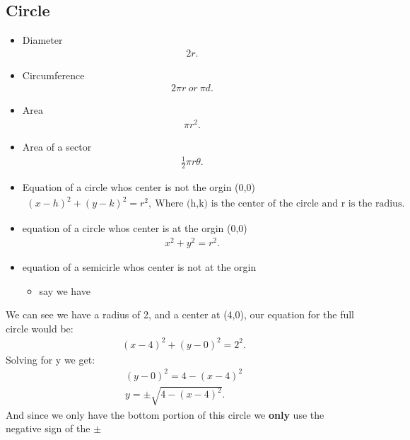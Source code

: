 \documentclass{report}
\begin{document}
    \subsection{Circle}
    \begin{itemize}
      \item Diameter
        \begin{align*}
          2r
        .\end{align*}
      \item Circumference
        \begin{align*}
          2\pi r\ or\ \pi d
        .\end{align*}
      \item Area
        \begin{align*}
          \pi r^{2}
        .\end{align*}
      \item Area of a sector
        \begin{align*}
          \frac{1}{2}\pi r\theta
        .\end{align*}
      \item Equation of a circle whos center is not the orgin (0,0)
        \begin{align*}
          (x-h)^{2} + (y-k)^{2} = r^{2},\ \text{Where (h,k) is the center of the circle and r is the radius}
        .\end{align*}
      \item equation of a circle whos center is at the orgin (0,0)
        \begin{align*}
          x^{2} +y^{2} = r^{2}
        .\end{align*}
      \item equation of a semicirle whos center is not at the orgin
        \begin{itemize}
          \item say we have
        \end{itemize}
      \begin{figure}[ht]
          \centering
          \label{fig:fig1}
      \end{figure}
      \end{itemize}
      \bigbreak \noindent 
      We can see we have a radius of 2, and a center at (4,0), our equation for the full circle would be:
      \begin{align*}
        (x-4)^{2} + (y-0)^{2} = 2^{2}
      .\end{align*}
      \bigbreak \noindent 
      Solving for y we get:
      \begin{align*}
        (y-0)^{2} = 4 - (x-4)^{2} \\
        y = \pm\sqrt{4-(x-4)^{2}}
      .\end{align*}
      \bigbreak \noindent 
      And since we only have the bottom portion of this circle we \textbf{only} use the negative sign of the $\pm $
\end{document}
